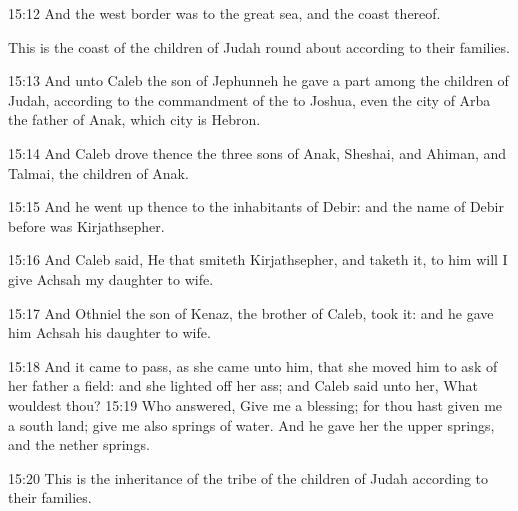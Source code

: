 15:12 And the west border was to the great sea, and the coast thereof.

This is the coast of the children of Judah round about according to
their families.

15:13 And unto Caleb the son of Jephunneh he gave a part among the
children of Judah, according to the commandment of the \LORD to Joshua,
even the city of Arba the father of Anak, which city is Hebron.

15:14 And Caleb drove thence the three sons of Anak, Sheshai, and
Ahiman, and Talmai, the children of Anak.

15:15 And he went up thence to the inhabitants of Debir: and the name
of Debir before was Kirjathsepher.

15:16 And Caleb said, He that smiteth Kirjathsepher, and taketh it, to
him will I give Achsah my daughter to wife.

15:17 And Othniel the son of Kenaz, the brother of Caleb, took it: and
he gave him Achsah his daughter to wife.

15:18 And it came to pass, as she came unto him, that she moved him to
ask of her father a field: and she lighted off her ass; and Caleb said
unto her, What wouldest thou?  15:19 Who answered, Give me a blessing;
for thou hast given me a south land; give me also springs of water.
And he gave her the upper springs, and the nether springs.

15:20 This is the inheritance of the tribe of the children of Judah
according to their families.


